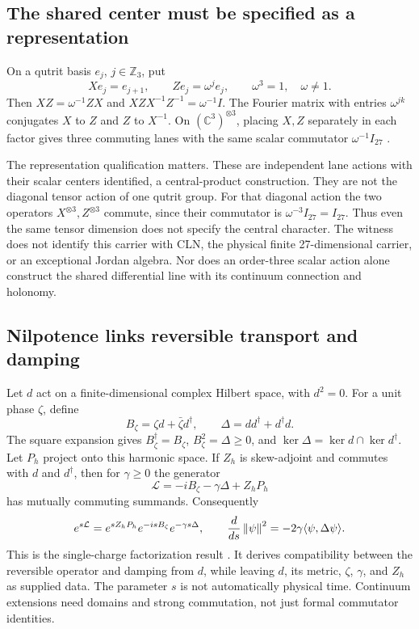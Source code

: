 \documentclass[11pt,a4paper]{article}
\begin{document}
\subsection{The shared center must be specified as a representation}
\label{sec:central-qutrit-character}
On a qutrit basis \(e_j\), \(j\in\mathbb Z_3\), put
\[
 Xe_j=e_{j+1},\qquad Ze_j=\omega^j e_j,\qquad \omega^3=1,
 \quad \omega\ne1.
\]
Then \(XZ=\omega^{-1}ZX\) and
\(XZX^{-1}Z^{-1}=\omega^{-1}I\). The Fourier matrix with entries
\(\omega^{jk}\) conjugates \(X\) to \(Z\) and \(Z\) to \(X^{-1}\).
On \((\mathbb C^3)^{\otimes3}\), placing \(X,Z\) separately in each
factor gives three commuting lanes with the same scalar commutator
\(\omega^{-1}I_{27}\) \cite{PreprojectionCentralQutrit2026}.

The representation qualification matters. These are independent lane
actions with their scalar centers identified, a central-product
construction. They are not the diagonal tensor action of one qutrit group.
For that diagonal action the two operators \(X^{\otimes3},Z^{\otimes3}\)
commute, since their commutator is \(\omega^{-3}I_{27}=I_{27}\).
Thus even the same tensor dimension does not specify the central character.
The witness does not identify this carrier with CLN, the physical finite
27-dimensional carrier, or an exceptional Jordan algebra. Nor does an
order-three scalar action alone construct the shared differential line
with its continuum connection and holonomy.

\subsection{Nilpotence links reversible transport and damping}
\label{sec:single-charge-factorization}
Let \(d\) act on a finite-dimensional complex Hilbert space, with
\(d^2=0\). For a unit phase \(\zeta\), define
\[
 B_\zeta=\zeta d+\bar\zeta d^\dagger,\qquad
 \Delta=dd^\dagger+d^\dagger d.
\]
The square expansion gives \(B_\zeta^\dagger=B_\zeta\),
\(B_\zeta^2=\Delta\geq0\), and
\(\ker\Delta=\ker d\cap\ker d^\dagger\). Let \(P_h\) project onto
this harmonic space. If \(Z_h\) is skew-adjoint and commutes with \(d\)
and \(d^\dagger\), then for \(\gamma\geq0\) the generator
\[
 \mathcal L=-iB_\zeta-\gamma\Delta+Z_hP_h
\]
has mutually commuting summands. Consequently
\[
 e^{s\mathcal L}=e^{sZ_hP_h}e^{-isB_\zeta}e^{-\gamma s\Delta},
 \qquad
 \frac{d}{ds}\left\lVert \psi \right\rVert^2=-2\gamma\langle\psi,\Delta\psi\rangle.
\]
This is the single-charge factorization result
\cite{PreprojectionSingleCharge2026}. It derives compatibility between
the reversible operator and damping from \(d\), while leaving \(d\), its
metric, \(\zeta\), \(\gamma\), and \(Z_h\) as supplied data. The
parameter \(s\) is not automatically physical time. Continuum extensions
need domains and strong commutation, not just formal commutator identities.
\end{document}
